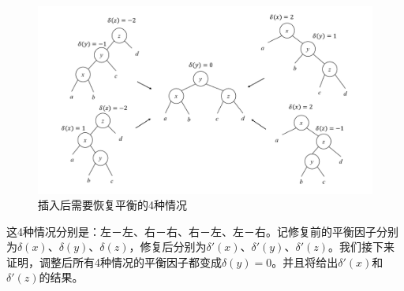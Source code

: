 \documentclass[b5paper]{ctexart}
\begin{document}
\begin{figure}[htbp]
  \centering
  \includegraphics[scale=0.4]{../../../datastruct/tree/AVL-tree/img/avl-insert-fix}
  \caption{插入后需要恢复平衡的4种情况}
  \label{fig:avl-insert-fix-appendix}
\end{figure}

这4种情况分别是：左－左、右－右、右－左、左－右。记修复前的平衡因子分别为$\delta(x)$、$\delta(y)$、$\delta(z)$，修复后分别为$\delta'(x)$、$\delta'(y)$、$\delta'(z)$。我们接下来证明，调整后所有4种情况的平衡因子都变成$\delta(y)=0$。并且将给出$\delta'(x)$和$\delta'(z)$的结果。
\end{document}
